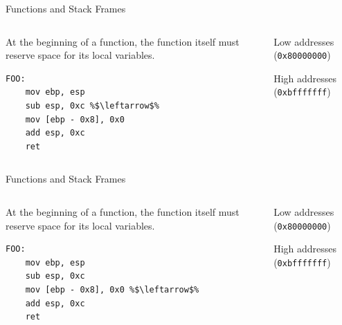 \documentclass[]{beamer}
\begin{document}
\begin{frame}[fragile]{Functions and Stack Frames}
  \begin{columns}
    \begin{column}{0.45\linewidth}
      At the beginning of a function, the function itself must reserve space for its local variables.
      \begin{lstlisting}[language={[x86masm]Assembler}, escapechar=\%]
FOO:
    mov ebp, esp 
    sub esp, 0xc %$\leftarrow$%
    mov [ebp - 0x8], 0x0
    add esp, 0xc
    ret
      \end{lstlisting}
    \end{column}
    \begin{column}{0.4\linewidth}
      \par
      {\scriptsize Low addresses ({\tt 0x80000000})}\\[.5em]
      {\scriptsize High addresses ({\tt 0xbfffffff})}
    \end{column}
  \end{columns}
\end{frame}

\begin{frame}[fragile]{Functions and Stack Frames}
  \begin{columns}
    \begin{column}{0.45\linewidth}
      At the beginning of a function, the function itself must reserve space for its local variables.
      \begin{lstlisting}[language={[x86masm]Assembler}, escapechar=\%]
FOO:
    mov ebp, esp 
    sub esp, 0xc 
    mov [ebp - 0x8], 0x0 %$\leftarrow$%
    add esp, 0xc
    ret
      \end{lstlisting}
    \end{column}
    \begin{column}{0.4\linewidth}
      \par
      {\scriptsize Low addresses ({\tt 0x80000000})}\\[.5em]
      {\scriptsize High addresses ({\tt 0xbfffffff})}
    \end{column}
  \end{columns}
\end{frame}
\end{document}
